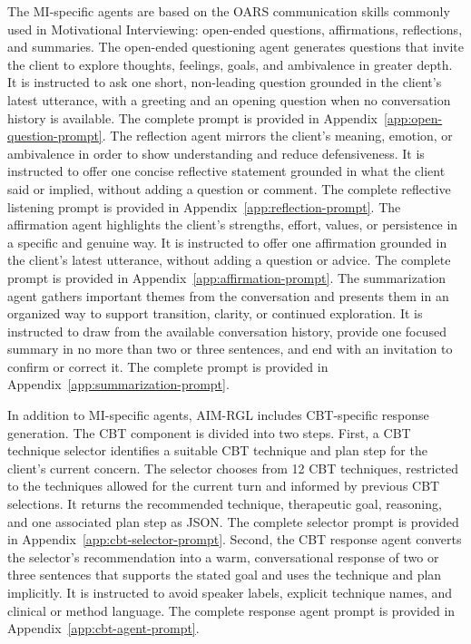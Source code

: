 The MI-specific agents are based on the OARS communication skills commonly used in Motivational Interviewing: open-ended questions, affirmations, reflections, and summaries. The open-ended questioning agent generates questions that invite the client to explore thoughts, feelings, goals, and ambivalence in greater depth. It is instructed to ask one short, non-leading question grounded in the client's latest utterance, with a greeting and an opening question when no conversation history is available. The complete prompt is provided in Appendix~\ref{app:open-question-prompt}. The reflection agent mirrors the client’s meaning, emotion, or ambivalence in order to show understanding and reduce defensiveness. It is instructed to offer one concise reflective statement grounded in what the client said or implied, without adding a question or comment. The complete reflective listening prompt is provided in Appendix~\ref{app:reflection-prompt}. The affirmation agent highlights the client’s strengths, effort, values, or persistence in a specific and genuine way. It is instructed to offer one affirmation grounded in the client's latest utterance, without adding a question or advice. The complete prompt is provided in Appendix~\ref{app:affirmation-prompt}. The summarization agent gathers important themes from the conversation and presents them in an organized way to support transition, clarity, or continued exploration. It is instructed to draw from the available conversation history, provide one focused summary in no more than two or three sentences, and end with an invitation to confirm or correct it. The complete prompt is provided in Appendix~\ref{app:summarization-prompt}.

In addition to MI-specific agents, AIM-RGL includes CBT-specific response generation. The CBT component is divided into two steps. First, a CBT technique selector identifies a suitable CBT technique and plan step for the client’s current concern. The selector chooses from 12 CBT techniques, restricted to the techniques allowed for the current turn and informed by previous CBT selections. It returns the recommended technique, therapeutic goal, reasoning, and one associated plan step as JSON. The complete selector prompt is provided in Appendix~\ref{app:cbt-selector-prompt}. Second, the CBT response agent converts the selector's recommendation into a warm, conversational response of two or three sentences that supports the stated goal and uses the technique and plan implicitly. It is instructed to avoid speaker labels, explicit technique names, and clinical or method language. The complete response agent prompt is provided in Appendix~\ref{app:cbt-agent-prompt}.

